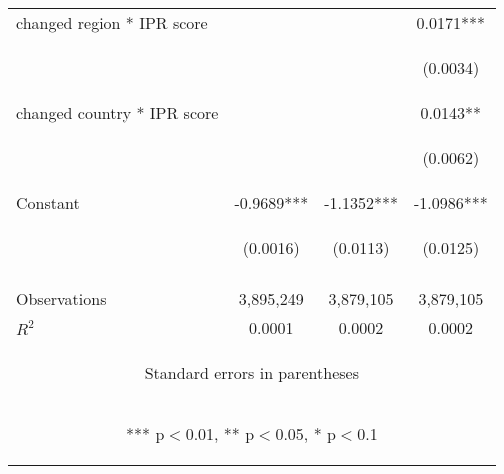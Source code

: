 \begin{center}
\begin{tabular}{lccc}
changed region * IPR score &  &  & 0.0171*** \\
\vspace{4pt} & \begin{footnotesize}\end{footnotesize} & \begin{footnotesize}\end{footnotesize} & \begin{footnotesize}(0.0034)\end{footnotesize} \\
changed country * IPR score &  &  & 0.0143** \\
\vspace{4pt} & \begin{footnotesize}\end{footnotesize} & \begin{footnotesize}\end{footnotesize} & \begin{footnotesize}(0.0062)\end{footnotesize} \\
Constant & -0.9689*** & -1.1352*** & -1.0986*** \\
 & \begin{footnotesize}(0.0016)\end{footnotesize} & \begin{footnotesize}(0.0113)\end{footnotesize} & \begin{footnotesize}(0.0125)\end{footnotesize} \\
\vspace{4pt} & \begin{footnotesize}\end{footnotesize} & \begin{footnotesize}\end{footnotesize} & \begin{footnotesize}\end{footnotesize} \\
Observations & 3,895,249 & 3,879,105 & 3,879,105 \\
 $R^2$ & 0.0001 & 0.0002 & 0.0002 \\ \hline
\multicolumn{4}{c}{\begin{footnotesize} Standard errors in parentheses\end{footnotesize}} \\
\multicolumn{4}{c}{\begin{footnotesize} *** p$<$0.01, ** p$<$0.05, * p$<$0.1\end{footnotesize}} \\
\end{tabular}
\end{center}
